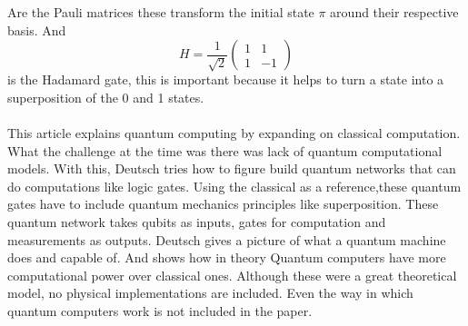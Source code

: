 \documentclass[12pt, a4paper]{Assignment}
\begin{document}
Are the Pauli matrices these transform the initial state $\pi$ around their respective basis.
And \begin{equation}H=\frac{1}{\sqrt{2}}
	\begin{pmatrix}
		1&1\\1&-1
	\end{pmatrix}
\end{equation} is the Hadamard gate, this is important because it helps to turn a state into a superposition of the 0 and 1 states.
\\
\\
This article \cite{Deutsch1989} explains quantum computing by expanding on classical computation.
What the challenge at the time was there was lack of quantum computational models.
With this, Deutsch tries how to figure build quantum networks that can do computations like logic gates.
Using the classical as a reference,these quantum gates have to include quantum mechanics principles like superposition.
These quantum network takes qubits as inputs, gates for computation and measurements as outputs.
Deutsch gives a picture of what a quantum machine does and capable of.
And shows how in theory Quantum computers have more computational power over classical ones.
Although these were a great theoretical model, no physical implementations are included.
Even the way in which quantum computers work is not included in the paper. 

\newpage 

\end{document}
